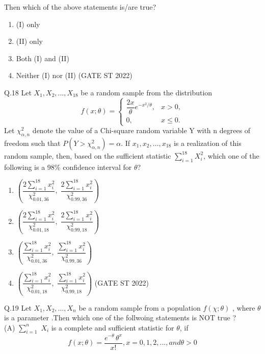 \documentclass[journal,12pt,onecolumn]{IEEEtran}
\theoremstyle{remark}
\begin{document}
Then which of the above statements is/are true?
\begin{enumerate}[label=\alph*.] 
	\item (I) only
	\item (II) only
	\item Both (I) and (II)
	\item Neither (I) nor (II)
	\hfill (GATE ST 2022)
\end{enumerate}
	\vspace{2em}
Q.18 Let $X_1, X_2, \dots, X_{18}$ be a random sample from the distribution
\[
f(x; \theta) =
\begin{cases}
	\dfrac{2x}{\theta} e^{-x^2/\theta}, & x > 0, \\[4pt]
	0, & x \leq 0.
\end{cases}
\]
Let $\chi^2_{\alpha,n}$ denote the value of a Chi-square random variable Y with n degrees of freedom such that $P(Y > \chi^2_{\alpha, n}) = \alpha$. If $x_1, x_2, \dots, x_{18}$ is a realization of this random sample, then, based on the sufficient statistic $\sum_{i = 1}^{18} X^2_i$, which one of the following is a 98\% confidence interval for $\theta$?
\begin{enumerate}
	\item $	\left( 
	\dfrac{2 \sum_{i=1}^{18} x_i^2}{\chi^2_{0.01,36}},\;
	\dfrac{2 \sum_{i=1}^{18} x_i^2}{\chi^2_{0.99,36}} 
	\right)
	$
	\item	$
	\left( 
	\dfrac{2 \sum_{i=1}^{18} x_i^2}{\chi^2_{0.01,18}},\;
	\dfrac{2 \sum_{i=1}^{18} x_i^2}{\chi^2_{0.99,18}} 
	\right)$
	\item$ 	\left( 
	\dfrac{ \sum_{i=1}^{18} x_i^2}{\chi^2_{0.01,36}},\;
	\dfrac{ \sum_{i=1}^{18} x_i^2}{\chi^2_{0.99,36}} 
	\right)$
	\item $	\left( 
	\dfrac{\sum_{i=1}^{18} x_i^2}{\chi^2_{0.01,18}},\;
	\dfrac{\sum_{i=1}^{18} x_i^2}{\chi^2_{0.99,18}} 
	\right)$
	\hfill (GATE ST 2022)
\end{enumerate}
	\vspace{2em}
Q.19 Let $X_1,X_2, \dots ,X_n$ be a random sample from a population $f(\chi; \theta)$ , where $\theta$ is a parameter .Then which one of the follwoing statements is NOT true ?\\
(A) $\sum_{i=1}^{n}$ $X_i$ is a complete and sufficient  statistic for $\theta$, if \[
f(x; \theta) = 
\dfrac{e^{-\theta}\,\theta^{x}}{x!} , x = 0,1,2, ..., and \theta > 0
\]\\
\end{document}
